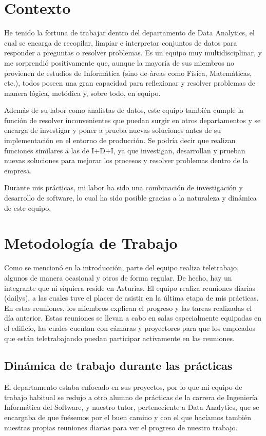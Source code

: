 

\section{Contexto}\label{sec:contexto}
He tenido la fortuna de trabajar dentro del departamento de Data Analytics, el cual se encarga de recopilar, limpiar e interpretar conjuntos de datos para responder a preguntas o resolver problemas. Es un equipo muy multidisciplinar, y me sorprendió positivamente que, aunque la mayoría de sus miembros no provienen de estudios de Informática (sino de áreas como Física, Matemáticas, etc.), todos poseen una gran capacidad para reflexionar y resolver problemas de manera lógica, metódica y, sobre todo, en equipo.

Además de su labor como analistas de datos, este equipo también cumple la función de resolver inconvenientes que puedan surgir en otros departamentos y se encarga de investigar y poner a prueba nuevas soluciones antes de su implementación en el entorno de producción. Se podría decir que realizan funciones similares a las de I+D+I, ya que investigan, desarrollan y prueban nuevas soluciones para mejorar los procesos y resolver problemas dentro de la empresa.

Durante mis prácticas, mi labor ha sido una combinación de investigación y desarrollo de software, lo cual ha sido posible gracias a la naturaleza y dinámica de este equipo.


\section{Metodología de Trabajo}
Como se mencionó en la introducción, parte del equipo realiza teletrabajo, algunos de manera ocasional y otros de forma regular. De hecho, hay un integrante que ni siquiera reside en Asturias. El equipo realiza reuniones diarias (dailys), a las cuales tuve el placer de asistir en la última etapa de mis prácticas. En estas reuniones, los miembros explican el progreso y las tareas realizadas el día anterior. Estas reuniones se llevan a cabo en salas especialmente equipadas en el edificio, las cuales cuentan con cámaras y proyectores para que los empleados que están teletrabajando puedan participar activamente en las reuniones.

\subsection{Dinámica de trabajo durante las prácticas}
El departamento estaba enfocado en sus proyectos, por lo que mi equipo de trabajo habitual se 
redujo a otro alumno de prácticas de la carrera de Ingeniería Informática del Software, y nuestro tutor, 
perteneciente a Data Analytics, que se encargaba de que fuésemos por el buen camino y con el que hacíamos
también nuestras propias reuniones diarias para ver el progreso de nuestro trabajo.

